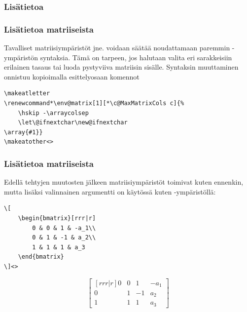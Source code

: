 \subsubsection{Lisätietoa}
\begin{fframe}
    \frametitle{Lisätietoa matriiseista}
    Tavalliset matriisiympäristöt  jne. voidaan säätää noudattamaan paremmin -ympäristön syntaksia.
    \vaihto
    Tämä on tarpeen, jos halutaan valita eri sarakkeisiin erilainen tasaus tai luoda pystyviiva matriisin sisälle. 
    \pause
    \vaihto
    Syntaksin muuttaminen onnistuu kopioimalla esittelyosaan komennot\vaihto
    \begin{lstlisting}
\makeatletter
\renewcommand*\env@matrix[1][*\c@MaxMatrixCols c]{%
    \hskip -\arraycolsep
    \let\@ifnextchar\new@ifnextchar
\array{#1}}
\makeatother<>
    \end{lstlisting}
\end{fframe}

\begin{fframe}
    \frametitle{Lisätietoa matriiseista}
    Edellä tehtyjen muutosten jälkeen matriisiympäristöt toimivat kuten ennenkin, mutta lisäksi valinnainen argumentti on käytössä kuten -ympäristöllä:
    \vaihto
    \begin{minipage}{6cm}
        \begin{lstlisting}
\[
    \begin{bmatrix}[rrr|r]
        0 & 0 & 1 & -a_1\\
        0 & 1 & -1 & a_2\\
        1 & 1 & 1 & a_3
    \end{bmatrix}
\]<>
        \end{lstlisting}
    \end{minipage}
    \begin{minipage}{4cm}
        \[
            \begin{bmatrix}[rrr|r]
                0 & 0 & 1 & -a_1\\
                0 & 1 & -1 & a_2\\
                1 & 1 & 1 & a_3
            \end{bmatrix}
        \]
    \end{minipage}
\end{fframe}

